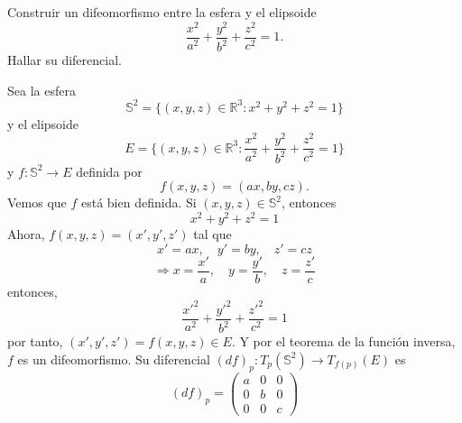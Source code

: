\begin{ejr}[2]
  Construir un difeomorfismo entre la esfera y el elipsoide
  \[ 
    \frac{x^{2}}{a^{2}} + \frac{y^{2}}{b ^{2}} + \frac{z^{2}}{c^{2}} = 1. 
  \] 
  Hallar su diferencial.
\end{ejr}

\begin{sol}
  Sea la esfera
  \[
    \mathbb{S}^{2} = \{ (x, y, z) \in \mathbb{R}^{3} : x^{2} + y^{2} + z^{2} = 1\}
  \]
  y el elipsoide
  \[ 
    E = \{ (x, y, z) \in \mathbb{R}^{3} : \frac{x^{2}}{a^{2}} + \frac{y^{2}}{b ^{2}} + \frac{z^{2}}{c^{2}} =1 \} 
  \] 
  y $f : \mathbb{S}^{2} \to E$ definida por
  \[ 
    f(x, y, z) = (ax, by, cz) .
  \] 
  Vemos que $f$ está bien definida. Si $(x, y, z) \in \mathbb{S}^{2}$, entonces
  \[ 
    x^{2} + y^{2} + z^{2} = 1 
  \] 
  Ahora, $f(x, y, z) = (x', y', z')$ tal que 
  \[ 
    x' = a x, \quad y' = b y, \quad z' = c z 
  \] 
  \[ 
    \Rightarrow x = \frac{x'}{a}, \quad y = \frac{y'}{b}, \quad z = \frac{z'}{c} 
  \] 
  entonces,
  \[ 
    \frac{x'^{2}}{a^{2}} + \frac{y'^{2}}{b ^{2}} + \frac{z'^{2}}{c^{2}} = 1
  \] 
  por tanto, $(x', y', z') = f(x, y, z) \in E$. Y por el teorema de la función inversa, $f$ es un difeomorfismo. Su diferencial $(d f)_{p} : T_{p}(\mathbb{S}^{2}) \to T_{f(p)}(E)$ es
  \[ 
    (d f)_{p} =
    \begin{pmatrix}
       a & 0 & 0\\
       0 & b & 0\\
       0 & 0 & c
    \end{pmatrix}
  \] 

\end{sol}

